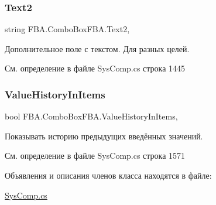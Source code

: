 \subsubsection{\texorpdfstring{Text2}{Text2}}
{\footnotesize\ttfamily string F\+B\+A.\+Combo\+Box\+F\+B\+A.\+Text2\hspace{0.3cm}{\ttfamily [get]}, {\ttfamily [set]}}



Дополнительное поле с текстом. Для разных целей. 



См. определение в файле Sys\+Comp.\+cs строка 1445

\mbox{\label{class_f_b_a_1_1_combo_box_f_b_a_a1152b8807c76816244c86a6ea3c63855}} 
\subsubsection{\texorpdfstring{Value\+History\+In\+Items}{ValueHistoryInItems}}
{\footnotesize\ttfamily bool F\+B\+A.\+Combo\+Box\+F\+B\+A.\+Value\+History\+In\+Items\hspace{0.3cm}{\ttfamily [get]}, {\ttfamily [set]}}



Показывать историю предыдущих введённых значений. 



См. определение в файле Sys\+Comp.\+cs строка 1571



Объявления и описания членов класса находятся в файле\+:\begin{DoxyCompactItemize}
\item 
\mbox{\hyperlink{_sys_comp_8cs}{Sys\+Comp.\+cs}}\end{DoxyCompactItemize}
